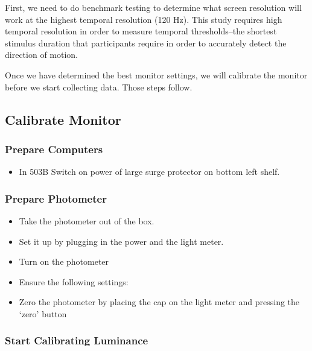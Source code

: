\documentclass[]{article}
\providecommand{\tightlist}{%
  \setlength{\itemsep}{0pt}\setlength{\parskip}{0pt}}
\begin{document}
First, we need to do benchmark testing to determine what screen
resolution will work at the highest temporal resolution (120 Hz). This
study requires high temporal resolution in order to measure temporal
thresholds--the shortest stimulus duration that participants require in
order to accurately detect the direction of motion.

Once we have determined the best monitor settings, we will calibrate the
monitor before we start collecting data. Those steps follow.

\hypertarget{calibrate-monitor}{%
\subsection{Calibrate Monitor}\label{calibrate-monitor}}

\hypertarget{prepare-computers}{%
\subsubsection{Prepare Computers}\label{prepare-computers}}

\begin{itemize}
\tightlist
\item
  In 503B Switch on power of large surge protector on bottom left shelf.
\end{itemize}

\hypertarget{prepare-photometer}{%
\subsubsection{Prepare Photometer}\label{prepare-photometer}}

\begin{itemize}
\tightlist
\item
  Take the photometer out of the box.
\item
  Set it up by plugging in the power and the light meter.
\item
  Turn on the photometer
\item
  Ensure the following settings:
\item
  Zero the photometer by placing the cap on the light meter and pressing
  the `zero' button
\end{itemize}

\hypertarget{start-calibrating-luminance}{%
\subsubsection{Start Calibrating
Luminance}\label{start-calibrating-luminance}}
\end{document}
